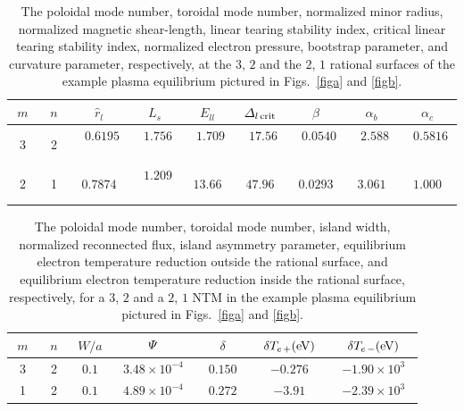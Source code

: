 \documentclass[12pt,prb,aps]{revtex4-1}
\begin{document}
\newpage
\begin{table}
\begin{tabular}{ccccccccc}
\hline
$m$ & $n$ & $\hat{r}_l$ & $L_s$ & $E_{ll}$ & ${\mit\Delta}_{l\,{\rm crit}}$ & $\hat{\beta}$ & $\alpha_b$ & $\alpha_c$\\[0.5ex]\hline
~3~&~2~ & ~$0.6195$~ & ~$1.756$~ & ~$1.709$~ & ~$17.56$~ & ~$0.0540$~ & ~$2.588$~ & ~$0.5816$~\\[0.5ex]
2& 1& $0.7874$  & ~$1.209$~&$ 13.66$ & $47.96$ & $0.0293$ & $3.061$ & $1.000$\\\hline
\end{tabular}
\caption{The poloidal mode number, toroidal mode number, normalized minor radius, normalized magnetic shear-length, linear tearing stability index, critical linear tearing stability index, normalized
electron pressure, bootstrap parameter, and curvature parameter, respectively, at the $3$, $2$ and the $2$, $1$ rational surfaces of the example
plasma equilibrium pictured in Figs.~\ref{figa} and \ref{figb}. \label{t1} }
\end{table}

\begin{table}
\begin{tabular}{ccccccc}
\hline
$m$ & $n$ & $W/a$ & ${\mit\Psi}$ & $\delta$ & ~$\delta T_{e\,+}({\rm eV})$~ & $\delta T_{e\,-}({\rm eV})$ \\[0.5ex]\hline
3& 2& $0.1$  & ~$3.48\times 10^{-4}$~&$0.150$ & $-0.276$ & $-1.90\times 10^{3}$\\[0.5ex]
~1~&~2~ & ~$0.1$~ & ~$4.89\times 10^{-4}$~ & ~$0.272$~ & ~$-3.91$~ & ~$-2.39\times 10^{3}$~\\\hline
\end{tabular}
\caption{The poloidal mode number, toroidal mode number, island width, normalized reconnected flux, island asymmetry parameter, equilibrium electron temperature reduction
outside the rational surface,  and equilibrium electron temperature reduction
inside the rational surface, respectively, for a $3$, $2$ and a $2$, $1$ NTM in the example
plasma equilibrium pictured in Figs.~\ref{figa} and \ref{figb}.  \label{t2} }
\end{table}
\end{document}
